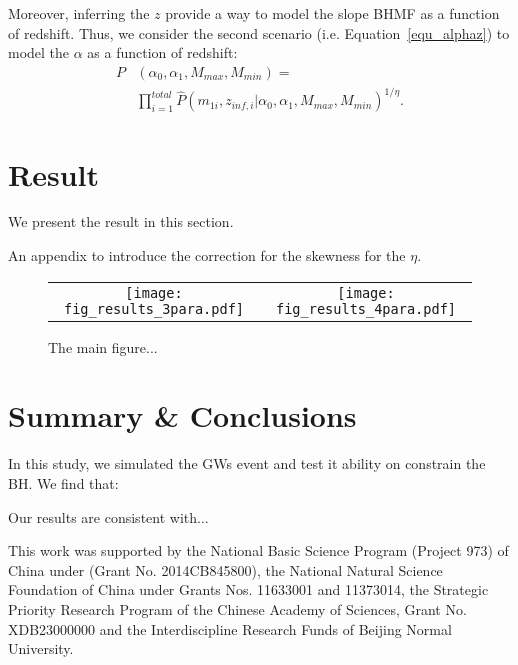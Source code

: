 \documentclass[twocolumn]{aastex62}
\begin{document}
Moreover, inferring the $z$ provide a way to model the slope BHMF as a function of redshift. Thus, we consider the second scenario (i.e. Equation~\ref{equ_alphaz}) to model the $\alpha$ as a function of redshift:
 \begin{equation} \label{equ_likelihood_alphaz}
 \begin{split}
 P&(\alpha_0, \alpha_1, M_{max}, M_{min}) = \\
  &\prod_{i=1}^{total} \hat{P}(m_{1i}, z_{inf,i} |\alpha_0, \alpha_1, M_{max}, M_{min})^{1/\eta}.
  \end{split}
 \end{equation}


\vspace{1cm}

\section{Result}\label{sec_result}
We present the result in this section.

An appendix to introduce the correction for the skewness for the $\eta$.

\begin{figure*}%
\begin{tabular}{c c}
\texttt{[image: fig\_results\_3para.pdf]} &
\texttt{[image: fig\_results\_4para.pdf]} \\
\end{tabular}
\caption{
The main figure... 
}
\label{fig:result_slope}
\end{figure*}

\section{Summary \& Conclusions} \label{sec:summary}

In this study, we simulated the GWs event and test it ability on constrain the BH. We find that:


Our results are consistent with...



\acknowledgments

This work was supported by the National Basic Science Program (Project 973) of China under (Grant No. 2014CB845800), the National Natural Science Foundation of China under Grants Nos. 11633001 and 11373014, the Strategic Priority Research Program of the Chinese Academy of Sciences, Grant No. XDB23000000 and the Interdiscipline Research Funds of Beijing Normal University.
\end{document}
